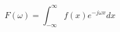 \documentclass[../main.tex]{subfiles}%
\begin{document}
%
    \Xequation%
    \begin{equation}%
        F(\omega) = \int_{-\infty}^{\infty} f(x) e^{-j \omega x} dx%
        \label{eq:fourier-continuous}%
    \end{equation}%
\end{document}
